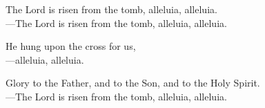 \responsory

\noindent The Lord is risen from the tomb, alleluia, alleluia.\\
{\color{red}---\thinspace}The Lord is risen from the tomb, alleluia, alleluia.

\medskip\noindent He hung upon the cross for us,\\
{\color{red}---\thinspace}alleluia, alleluia.

\medskip\noindent Glory to the Father, and to the Son, and to the Holy Spirit.\\
{\color{red}---\thinspace}The Lord is risen from the tomb, alleluia, alleluia.